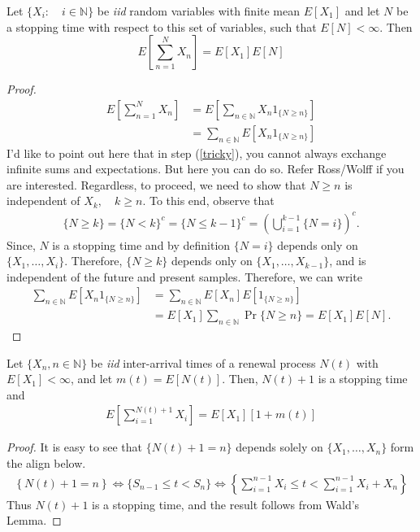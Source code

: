 \documentclass[a4paper,10pt, english]{article}
\begin{document}
\begin{lem}
Let $\{X_i:\quad i\in \mathbb{N}\}$ be \emph{iid} random variables with finite mean $E[X_1]$ and let $N$ be a stopping time with respect to this set of variables, such that $E[N] < \infty$. Then
\[E\left[\sum_{n=1}^N X_n\right] = E[X_1]E[N]\]
\end{lem}
\begin{proof}
\begin{align}
E\left[\sum_{n=1}^N X_n\right] &= E\left[\sum_{n \in \mathbb{N}} X_n 1_{\{N \geq n\}}\right]  \\
&= \sum_{n \in \mathbb{N}} E\left[X_n 1_{\{N \geq n\}}\right] \label{tricky}
\end{align}
I'd like to point out here that in step (\ref{tricky}), you cannot always exchange infinite sums and expectations. But here you can do so. Refer Ross/Wolff if you are interested. Regardless, to proceed, we need to show that $N \geq n$ is independent of $X_k, \quad k \geq n$. To this end, observe that 
\begin{align*}
\{N \geq k\} = \{N < k\}^c = \{N \leq k-1\}^c = \left(\bigcup_{i=1}^{k-1} \{N = i\}\right)^c. 
\end{align*}
Since, $N$ is a stopping time and by definition $\{N=i\}$ depends only on $\{X_1,\ldots, X_i\}$. Therefore, $\{N \geq k\}$ depends only on $\{X_1,\ldots, X_{k-1}\}$, and is independent of the future and present samples. Therefore, we can write
\begin{align*}
\sum_{n \in \mathbb{N}} E\left[X_n 1_{\{N \geq n\}}\right] &= \sum_{n \in \mathbb{N}} E\left[X_n\right]E\left[ 1_{\{N \geq n\}}\right] \\
&= E\left[X_1\right] \sum_{n \in \mathbb{N}} \Pr\{N \geq n\} = E[X_1]E[N].
\end{align*} 
\end{proof}

\begin{prop} \label{prop:WaldRenewal}
Let $\{X_n, n \in \mathbb{N}\}$ be \emph{iid} inter-arrival times of a renewal process $N(t)$ with $E[X_1] < \infty$, and let $m(t) = E[N(t)]$. Then, $N(t)+1$ is a stopping time and 
 \begin{align*}
E\left[\sum_{i=1}^{N(t)+1}X_i\right] = E[X_1][1+m(t)]
\end{align*}
\end{prop}
\begin{proof} It is easy to see that $\{N(t)+1=n\}$ depends solely on $\{X_1,\ldots,X_n\}$ form the align below.
\begin{align*}
\left\{N(t) + 1 = n \right\} \iff \{S_{n-1} \leq t < S_n\} \iff \left\{\sum_{i=1}^{n-1} X_i \leq t < \sum_{i=1}^{n-1} X_i + X_n\right\}
\end{align*}
Thus $N(t)+1$ is a stopping time, and the result follows from Wald's Lemma.
\end{proof}
\end{document}
